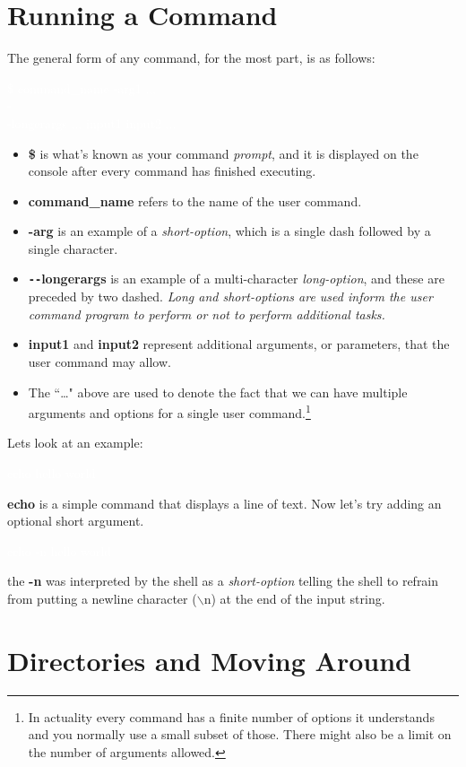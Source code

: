 \documentclass[oneside]{book}
\newcommand{\commandline}[1]{\begin{center} \colorbox{Dark}{\textcolor{white}{#1}} \end{center}}
\begin{document}
\section{Running a Command}
The general form of any command, for the most part, is as follows:
\commandline{\$ command\_name -arg1 ... \ \\-\\-longerargs ... input1 input2 ...}
\begin{itemize}
    \item \textbf{\$} is what's known as your command \textit{prompt}, and it is displayed on the console after every command has finished executing.
    \item \textbf{command\_name} refers to the name of the user command.
    \item \textbf{-arg} is an example of a \textit{short-option}, which is a single dash followed by a single character.
    \item \textbf{\texttt{-{}-}longerargs} is an example of a multi-character \textit{long-option}, and these are preceded by two dashed. \textit{Long and short-options are used inform the user command program to perform or not to perform additional tasks.}
    \item \textbf{input1} and \textbf{input2} represent additional arguments, or parameters, that the user command may allow.
    \item The ``\dots" above are used to denote the fact that we can have multiple arguments and options for a single user command.\footnote{In actuality every command has a finite number of options it understands and you normally use a small subset of those. There might also be a limit on the number of arguments allowed.}
\end{itemize}
   
Lets look at an example:
\commandline{echo hello world}

\textbf{echo} is a simple command that displays a line of text. Now let's try adding an optional short argument.

\commandline{echo -n hello world}

the \textbf{-n} was interpreted by the shell as a \textit{short-option} telling the shell to refrain from putting a newline character ($\backslash$n) at the end of the input string.

\section{Directories and Moving Around}
\end{document}
